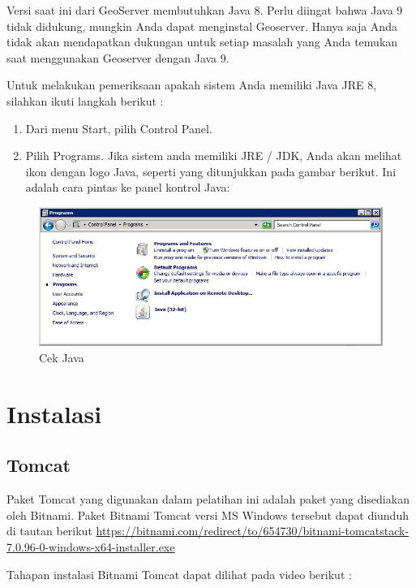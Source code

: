 \documentclass[]{book}
\begin{document}
Versi saat ini dari GeoServer membutuhkan Java 8. Perlu diingat bahwa Java 9 tidak didukung, mungkin Anda dapat menginstal Geoserver. Hanya saja Anda tidak akan mendapatkan
dukungan untuk setiap masalah yang Anda temukan saat menggunakan Geoserver dengan Java 9.

Untuk melakukan pemeriksaan apakah sistem Anda memiliki Java JRE 8, silahkan ikuti langkah berikut :

\begin{enumerate}
\def\labelenumi{\arabic{enumi}.}
\item
  Dari menu Start, pilih Control Panel.
\item
  Pilih Programs. Jika sistem anda memiliki JRE / JDK, Anda akan melihat ikon dengan
  logo Java, seperti yang ditunjukkan pada gambar berikut. Ini adalah cara pintas ke panel kontrol Java:
\end{enumerate}

\begin{figure}

{\centering \includegraphics[width=0.6\linewidth]{images/07/fig71} 

}

\caption{Cek Java}\label{fig:fig71}
\end{figure}

\hypertarget{instalasi}{%
\section{Instalasi}\label{instalasi}}

\hypertarget{tomcat}{%
\subsection{Tomcat}\label{tomcat}}

Paket Tomcat yang digunakan dalam pelatihan ini adalah paket yang disediakan oleh Bitnami. Paket Bitnami Tomcat versi MS Windows tersebut dapat diunduh di tautan berikut \url{https://bitnami.com/redirect/to/654730/bitnami-tomcatstack-7.0.96-0-windows-x64-installer.exe}

Tahapan instalasi Bitnami Tomcat dapat dilihat pada video berikut :
\end{document}
